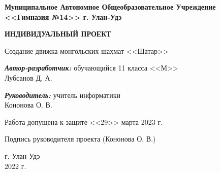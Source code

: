 \begin{titlepage}
	\begin{center}
		{\bf 
			Муниципальное Автономное Общеобразовательное Учреждение \\
			<<Гимназия №14>> г. Улан-Удэ
		}
		
		\vspace{4em}
		{\bf
			ИНДИВИДУАЛЬНЫЙ ПРОЕКТ
		}
		\vspace{6em}
		
		Создание движка монгольских шахмат <<Шатар>>
		
	\end{center}
	\vspace{8em}
	\begin{flushright}
		
		\textbf{\textit{Автор-разработчик:}}
		обучающийся 11 класса <<М>> \\
		Лубсанов Д. А.
		
		\vspace{2em}
		
		\textbf{\textit{Руководитель:}}
		учитель информатики \\
		Кононова О. В.
		
	\end{flushright}
	
	\vspace{6em}
	
	Работа допущена к защите <<29>> марта 2023 г.
	
	\vspace{1em}
	
	Подпись руководителя проекта \hrulefill (Кононова О. В.)
	
	\vspace{4em}
	
	\begin{center}
		г. Улан-Удэ \\
		2022 г.
	\end{center}
	
	\clearpage
\end{titlepage}